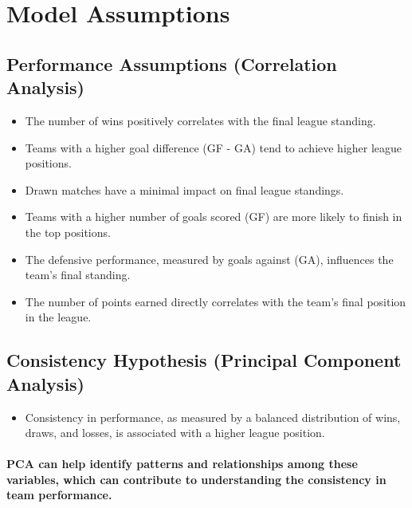 \section{Model Assumptions}
% 
% 
% 
\subsection{Performance Assumptions (Correlation Analysis)}
\begin{itemize}
    \item  The number of wins positively correlates with the final league standing.
    \item  Teams with a higher goal difference (GF - GA) tend to achieve higher league positions.
    \item Drawn matches have a minimal impact on final league standings.
    \item Teams with a higher number of goals scored (GF) are more likely to finish in the top positions.
    \item  The defensive performance, measured by goals against (GA), influences the team's final standing.
    \item  The number of points earned directly correlates with the team's final position in the league.
\end{itemize}
\subsection{Consistency Hypothesis (Principal Component Analysis)}
% 
% 
% 
% 
\begin{itemize}
    \item Consistency in performance, as measured by a balanced distribution of wins, draws, and losses, is associated with a higher league position.
\end{itemize}
\paragraph{PCA can help identify patterns and relationships among these variables, which can contribute to understanding the consistency in team performance.}